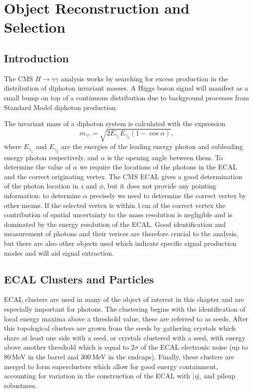 \chapter{Object Reconstruction and Selection}
\label{chap:object_reco}

\newpage

\section{Introduction}

The CMS $H\rightarrow{\gamma\gamma}$ analysis works by searching for excess production in the distribution of diphoton invariant masses. A Higgs boson signal will manifest as a small bump on top of a continuous distribution due to background processes from Standard Model diphoton production.

The invariant mass of a diphoton system is calculated with the expression
\begin{equation}
    m_{\gamma\gamma} = \sqrt{2E_{\gamma_1}E_{\gamma_2}(1-\cos{\alpha})},
\end{equation}
where $E_{\gamma_1}$ and $E_{\gamma_2}$ are the energies of the leading energy photon and subleading energy photon respectively, and $\alpha$ is the opening angle between them. 
To determine the value of $\alpha$ we require the locations of the photons in the ECAL and the correct originating vertex. 
The CMS ECAL gives a good determination of the photon location in $z$ and $\phi$, but it does not provide any pointing information: to determine $\alpha$ precisely we need to determine the correct vertex by other means.
If the selected vertex is within $1$\,cm of the correct vertex the contribution of spatial uncertainty to the mass resolution is negligible and is dominated by the energy resolution of the ECAL. 
Good identification and measurement of photons and their verices are therefore crucial to the analysis, but there are also other objects used which indicate specific signal production modes and will aid signal extraction.

\section{ECAL Clusters and Particles}

ECAL clusters are used in many of the object of interest in this chapter and are especially important for photons. 
The clustering begins with the identification of local energy maxima above a threshold value, these are referred to as seeds. 
After this topological clusters are grown from the seeds by gathering crystals which share at least one side with a seed, or crystals clustered with a seed, with energy above another threshold which is equal to $2\sigma$ of the ECAL electronic noise (up to 80\,MeV in the barrel and 300\,MeV in the endcaps).
Finally, these clusters are merged to form superclusters which allow for good energy containment, accounting for variation in the construction of the ECAL with $|\eta|$, and pileup robustness.



